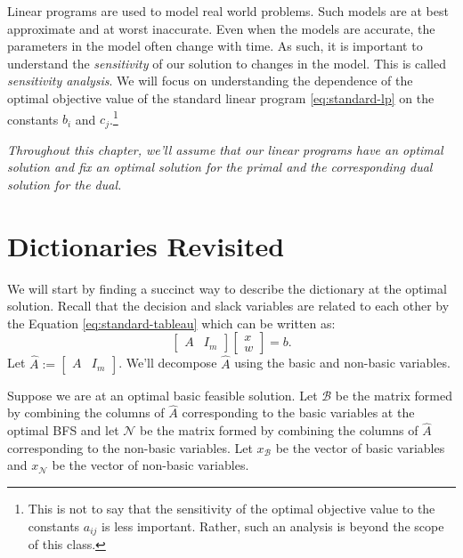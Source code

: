 \documentclass[
]{book}
\theoremstyle{definition}
\theoremstyle{definition}
\theoremstyle{definition}
\theoremstyle{definition}
\theoremstyle{remark}
\begin{document}
Linear programs are used to model real world problems. Such models are at best approximate and at
worst inaccurate. Even when the models are accurate, the parameters in the model often change with
time. As such, it is important to understand the \emph{sensitivity} of our solution to changes in the
model. This is called \emph{sensitivity analysis}. We will focus on understanding the dependence of the
optimal objective value of the standard linear program \eqref{eq:standard-lp} on the constants \(b_i\)
and \(c_j\).\footnote{This is not to say that the sensitivity of the optimal objective value to the constants
  \(a_{ij}\) is less important. Rather, such an analysis is beyond the scope of this class.}

\emph{Throughout this chapter, we'll assume that our linear programs have an optimal solution and fix an
optimal solution for the primal and the corresponding dual solution for the dual.}

\hypertarget{dictionaries-revisited}{%
\section{Dictionaries Revisited}\label{dictionaries-revisited}}

We will start by finding a succinct way to describe the dictionary at the optimal solution. Recall
that the decision and slack variables are related to each other by the Equation
\eqref{eq:standard-tableau} which can be written as:
\begin{equation}
  \begin{bmatrix} A & I_m \end{bmatrix}
    \begin{bmatrix} x \\ w \end{bmatrix}
      = b.
  \label{eq:dictionary-matrix}
\end{equation}
Let \(\widehat{A} := \begin{bmatrix} A & I_m \end{bmatrix}\). We'll decompose \(\widehat{A}\) using the
basic and non-basic variables.

Suppose we are at an optimal basic feasible solution. Let \(\mathcal{B}\) be the matrix formed by
combining the columns of \(\widehat{A}\) corresponding to the basic variables at the optimal BFS and
let \(\mathcal{N}\) be the matrix formed by combining the columns of \(\widehat{A}\) corresponding to
the non-basic variables. Let \(x_{\mathcal{B}}\) be the vector of basic variables and
\(x_{\mathcal{N}}\) be the vector of non-basic variables.
\end{document}
